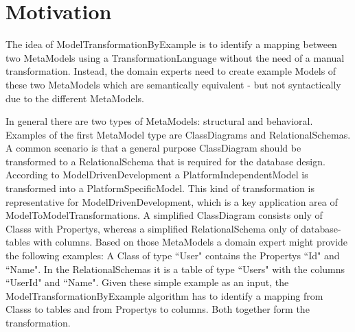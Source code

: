 \section{Motivation}
\label{secMotivation}

The idea of \gls{ModelTransformationByExample} is to identify a mapping between two \glspl{MetaModel} using a \gls{TransformationLanguage} without the need of a manual transformation. Instead, the domain experts need to create example \glspl{Model} of these two \glspl{MetaModel} which are semantically equivalent - but not syntactically due to the different \glspl{MetaModel}. 


In general there are two types of \glspl{MetaModel}: structural and behavioral. Examples of the first \gls{MetaModel} type are \glspl{ClassDiagram} and \glspl{RelationalSchema}. A common scenario is that a general purpose \gls{ClassDiagram} should be transformed to a \gls{RelationalSchema} that is required for the database design. According to \gls{ModelDrivenDevelopment} a \gls{PlatformIndependentModel} is transformed into a \gls{PlatformSpecificModel}. This kind of transformation is representative for \gls{ModelDrivenDevelopment}, which is a key application area of \glspl{ModelToModelTransformation}. A simplified \gls{ClassDiagram} consists only of \glspl{Class} with \glspl{Property}, whereas a simplified \gls{RelationalSchema} only of database-tables with columns. Based on those \glspl{MetaModel} a domain expert might provide the following examples: A \gls{Class} of type ``User" contains the \glspl{Property} ``Id" and ``Name". In the \glspl{RelationalSchema} it is a table of type ``Users" with the columns ``UserId" and ``Name". Given these simple example as an input, the \gls{ModelTransformationByExample} algorithm has to identify a mapping from \glspl{Class} to tables and from \glspl{Property} to columns. Both together form the transformation.


